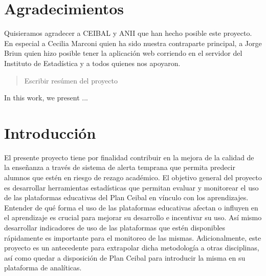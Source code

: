 \documentclass[msc,oneside,a4paper]{udelar}\usepackage[]{graphicx}\usepackage[]{color}
\begin{document}
\chapter*{Agradecimientos}

Quisieramos agradecer a CEIBAL y ANII que han hecho posible este proyecto. En especial a Cecilia Marconi quien ha sido nuestra contraparte principal, a Jorge Briun quien hizo posible tener la aplicación web corriendo en el servidor del Instituto de Estadística y a todos quienes nos apoyaron.



\begin{abstract}

Escribir resúmen del proyecto

\end{abstract}




\begin{foreignabstract}

In this work, we present ...

\end{foreignabstract}

    
    \tableofcontents
    \mainmatter


\chapter{Introducción}

El presente proyecto tiene por finalidad contribuir en la mejora de la calidad de la enseñanza a través de sistema de alerta temprana que permita predecir alumnos que estén en riesgo de rezago académico. El objetivo general del proyecto es desarrollar herramientas estadísticas que permitan evaluar y monitorear el uso de las plataformas educativas del Plan Ceibal en vínculo con los aprendizajes. Entender de qué forma el uso de las plataformas educativas afectan o influyen en el aprendizaje es crucial para mejorar su desarrollo e incentivar su uso. Así mismo desarrollar indicadores de uso de las plataformas que estén disponibles rápidamente es importante para el monitoreo de las mismas.
Adicionalmente, este proyecto es un antecedente para extrapolar dicha metodología a otras disciplinas, así como quedar a disposición de Plan Ceibal para introducir la misma en su plataforma de analíticas.
\end{document}
